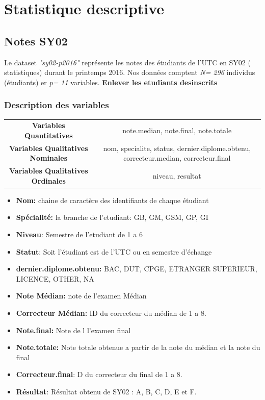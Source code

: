 \documentclass[]{report}
\begin{document}
\tableofcontents

\chapter{ Statistique descriptive}

\section{Notes SY02}
Le dataset \textit{"sy02-p2016"} représente les notes des étudiants de l'UTC en SY02 ( statistiques) durant le printemps 2016. Nos données comptent \textit{N= 296} individus (étudiants) er \textit{p= 11} variables.  \textbf{Enlever les etudiants desinscrits}

 \subsection{Description des variables}

\begin{center}
	\begin{tabular}{c c }
		\textbf{Variables Quantitatives} & note.median, note.final, note.totale \\ 
		 \textbf{Variables Qualitatives Nominales} & nom, specialite, status, dernier.diplome.obtenu, correcteur.median, correcteur.final\\
		  \textbf{Variables Qualitatives Ordinales}  & niveau, resultat  \\
	\end{tabular}
\end{center} 

\begin{itemize}
	\item \textbf{Nom:} chaine de caractère des identifiants de chaque étudiant
	\item \textbf{Spécialité:} la branche de l'etudiant: GB, GM, GSM, GP, GI
	\item \textbf{Niveau}: Semestre de l'etudiant de 1 a 6
	\item \textbf{Statut}: Soit l'étudiant est de l'UTC ou en semestre d'échange
	\item \textbf{dernier.diplome.obtenu:}
	BAC, DUT, CPGE, ETRANGER SUPERIEUR, LICENCE, OTHER, NA
	\item \textbf{Note Médian:} note de l'examen Médian
	\item \textbf{Correcteur Médian:} ID du correcteur du médian de 1 a 8. 
	\item \textbf{Note.final:} Note de l l'examen final
	\item \textbf{Note.totale:} Note totale obtenue a partir de la note du médian et la note du final
	\item \textbf{Correcteur.final}: D du correcteur du final de 1 a 8. 
	\item \textbf{Résultat}: Résultat obtenu de SY02 : A, B, C, D, E et F.
\end{itemize}
\end{document}
